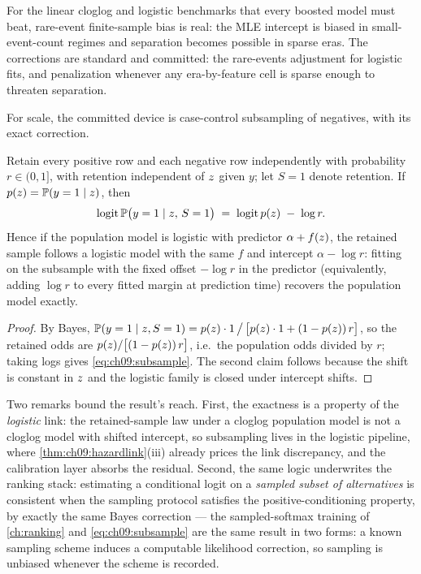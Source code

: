 For the linear cloglog and logistic benchmarks that every boosted model
must beat, rare-event finite-sample bias is real: the MLE intercept is
biased in small-event-count regimes and separation becomes possible in
sparse eras. The corrections are standard and committed: the
\citet{kingzeng2001} rare-events adjustment for logistic fits, and
\citet{firth1993} penalization whenever any era-by-feature cell is
sparse enough to threaten separation.

For scale, the committed device is case-control subsampling of
negatives, with its exact correction.

\begin{proposition}\label{prop:ch09:offset}
Retain every positive row and each negative row independently with
probability $r \in (0,1]$, with retention independent of $z$ given
$y$; let $S=1$ denote retention. If $p(z) = \mathbb{P}(y=1 \mid z)$,
then
\begin{equation}\label{eq:ch09:subsample}
\operatorname{logit} \mathbb{P}\big(y = 1 \mid z,\, S=1\big)
\;=\; \operatorname{logit} p(z) \;-\; \log r .
\end{equation}
Hence if the population model is logistic with predictor
$\alpha + f(z)$, the retained sample follows a logistic model with
the same $f$ and intercept $\alpha - \log r$: fitting on the subsample
with the fixed offset $-\log r$ in the predictor (equivalently, adding
$\log r$ to every fitted margin at prediction time) recovers the
population model exactly.
\end{proposition}

\begin{proof}
By Bayes,
$\mathbb{P}(y=1 \mid z, S=1) = p(z) \cdot 1 \,\big/\,
\big[ p(z) \cdot 1 + (1-p(z))\, r \big]$,
so the retained odds are $p(z) / \big[(1-p(z))\, r\big]$, i.e.\
the population odds divided by $r$; taking logs gives
\cref{eq:ch09:subsample}. The second claim follows because the shift is
constant in $z$ and the logistic family is closed under intercept
shifts.
\end{proof}

Two remarks bound the result's reach. First, the exactness is a property
of the \emph{logistic} link: the retained-sample law under a cloglog
population model is not a cloglog model with shifted intercept, so
subsampling lives in the logistic pipeline, where
\cref{thm:ch09:hazardlink}(iii) already prices the link discrepancy, and
the calibration layer absorbs the residual. Second, the same logic
underwrites the ranking stack: estimating a conditional logit on a
\emph{sampled subset of alternatives} is consistent when the sampling
protocol satisfies the positive-conditioning property, by exactly the
same Bayes correction \citep{mcfadden1978} --- the sampled-softmax
training of \cref{ch:ranking} and \cref{eq:ch09:subsample} are the same
result in two forms: a known sampling scheme induces a computable
likelihood correction, so sampling is unbiased whenever the scheme is
recorded.

